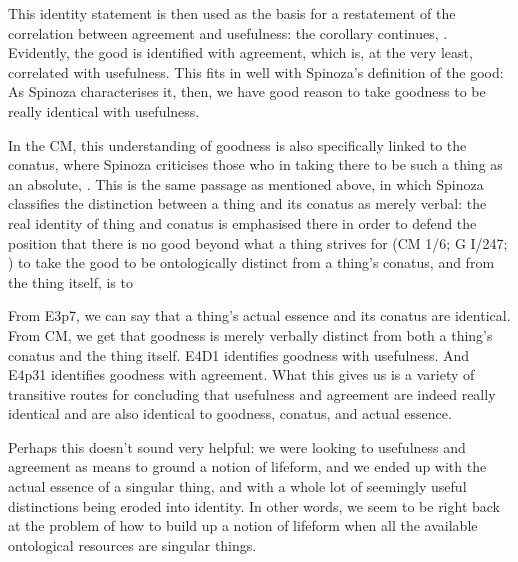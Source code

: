 \documentclass{article}
\newcommand{\dash}{\unskip{—}}
\begin{document}
This identity statement is then used as the basis for a restatement of the correlation between agreement and usefulness: the corollary continues, . Evidently, the good is identified with agreement, which is, at the very least, correlated with usefulness. This fits in well with Spinoza's definition of the good:  As Spinoza characterises it, then, we have good reason to take goodness to be really identical with usefulness.

In the CM, this understanding of goodness is also specifically linked to the conatus, where Spinoza criticises those who  in taking there to be such a thing as an absolute, . This is the same passage as mentioned above, in which Spinoza classifies the distinction between a thing and its conatus as merely verbal: the real identity of thing and conatus is emphasised there in order to defend the position that there is no good beyond what a thing strives for (CM 1/6; G \RN{1}/247; {\cite[313]{C1}}) \dash to take the good to be ontologically distinct from a thing's conatus, and from the thing itself, is to 

From E3p7, we can say that a thing's actual essence and its conatus are identical. From CM, we get that goodness is merely verbally distinct from both a thing's conatus and the thing itself. E4D1 identifies goodness with usefulness. And E4p31 identifies goodness with agreement. What this gives us is a variety of transitive routes for concluding that usefulness and agreement are indeed really identical \dash and are also identical to goodness, conatus, and actual essence.

Perhaps this doesn't sound very helpful: we were looking to usefulness and agreement as means to ground a notion of lifeform, and we ended up with the actual essence of a singular thing, and with a whole lot of seemingly useful distinctions being eroded into identity. In other words, we seem to be right back at the problem of how to build up a notion of lifeform when all the available ontological resources are singular things.
\end{document}
